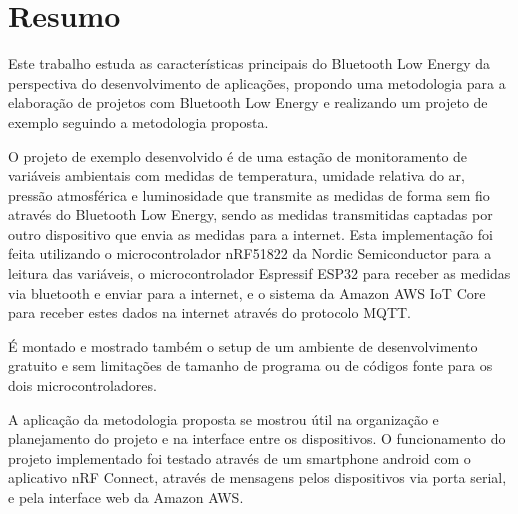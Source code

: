\section{Resumo}

Este trabalho estuda as características principais do Bluetooth Low Energy da
perspectiva do desenvolvimento de aplicações, propondo uma metodologia para a
elaboração de projetos com Bluetooth Low Energy e realizando um projeto de
exemplo seguindo a metodologia proposta. 

O projeto de exemplo desenvolvido é de uma estação de monitoramento de
variáveis ambientais com medidas de temperatura, umidade relativa do ar,
pressão atmosférica e luminosidade que transmite as medidas de forma sem fio
através do Bluetooth Low Energy, sendo as medidas transmitidas captadas por
outro dispositivo que envia as medidas para a internet. Esta implementação foi
feita utilizando o microcontrolador nRF51822 da Nordic Semiconductor para a
leitura das variáveis, o microcontrolador Espressif ESP32 para receber as
medidas via bluetooth e enviar para a internet, e o sistema da Amazon AWS IoT
Core para receber estes dados na internet através  do protocolo MQTT. 

É montado e mostrado também o setup de um ambiente de desenvolvimento gratuito
e sem limitações de tamanho de programa ou de códigos fonte para os dois
microcontroladores.

A aplicação da metodologia proposta se mostrou útil na organização e
planejamento do projeto e na interface entre os dispositivos. O funcionamento do
projeto implementado foi testado através de um smartphone android com o
aplicativo nRF Connect, através de mensagens pelos dispositivos via porta
serial, e pela interface web da Amazon AWS.

